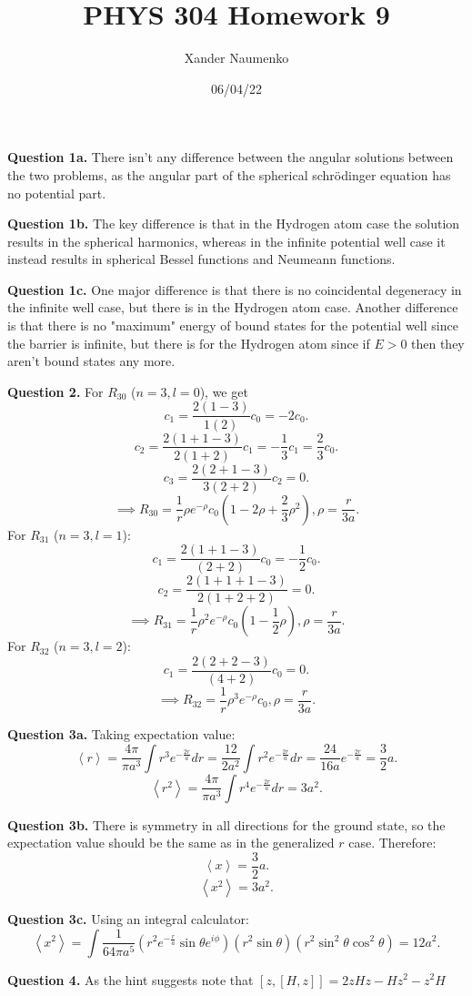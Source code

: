 \documentclass[letterpaper, reqno,11pt]{article}
\begin{document}
\title{PHYS 304 Homework 9}
\date{06/04/22}
\author{Xander Naumenko}
\maketitle

{\noindent\bf Question 1a.} There isn't any difference between the angular solutions between the two problems, as the angular part of the spherical schr\"odinger equation has no potential part. 

{\noindent\bf Question 1b.} The key difference is that in the Hydrogen atom case the solution results in the spherical harmonics, whereas in the infinite potential well case it instead results in spherical Bessel functions and Neumeann functions. 

{\noindent\bf Question 1c.} One major difference is that there is no coincidental degeneracy in the infinite well case, but there is in the Hydrogen atom case. Another difference is that there is no "maximum" energy of bound states for the potential well since the barrier is infinite, but there is for the Hydrogen atom since if $E>0$ then they aren't bound states any more. 

{\noindent\bf Question 2.} For $R_{30}$ ($n=3,l=0$), we get 
\[
c_1=\frac{2\left( 1-3 \right) }{1\left( 2 \right) }c_0=-2c_0
.\]
\[
c_2=\frac{2\left( 1+1-3 \right) }{2\left( 1+2 \right) }c_1=-\frac{1}{3}c_1=\frac{2}{3}c_0
.\]
\[
c_3=\frac{2(2+1-3)}{3\left( 2+2 \right) }c_2=0
.\]
\[
\implies R_{30}=\frac{1}{r}\rho e^{-\rho}c_0\left( 1-2\rho+\frac{2}{3}\rho^2 \right), \rho=\frac{r}{3a}
.\]
For $R_{31}$ ($n=3, l=1$):
\[
c_1=\frac{2\left( 1+1-3 \right) }{\left( 2+2 \right) }c_0=-\frac{1}{2}c_0
.\]
\[
c_2=\frac{2\left( 1+1+1-3 \right) }{2\left( 1+2+2 \right) }=0
.\]
\[
\implies R_{31}=\frac{1}{r}\rho^{2} e^{-\rho}c_0\left( 1-\frac{1}{2}\rho\right), \rho=\frac{r}{3a}
.\]
For $R_{32}$ ($n=3, l=2$):
\[
c_1=\frac{2\left( 2+2-3 \right) }{\left( 4+2 \right) }c_0=0
.\]
\[
\implies R_{32}=\frac{1}{r}\rho^{3} e^{-\rho}c_0, \rho=\frac{r}{3a}
.\]

{\noindent\bf Question 3a.} Taking expectation value: 
\[
\left<r \right>=\frac{4\pi}{\pi a^3 }\int r^{3} e^{-\frac{2r}{a}}dr=\frac{12}{2 a^2}\int r^2e^{-\frac{2r}{a}}dr=\frac{24}{16 a}e^{-\frac{2r}{a}}=\frac{3}{2}a
.\]
\[
\left<r^2 \right>=\frac{4\pi}{\pi a^3}\int r^{4}e^{-\frac{2r}{a}}dr=3a^2
.\]

{\noindent\bf Question 3b.} There is symmetry in all directions for the ground state, so the expectation value should be the same as in the generalized $r$ case. Therefore: 
\[
\left<x \right>=\frac{3}{2}a
.\]
\[
\left<x^2 \right>=3a^2
.\]

{\noindent\bf Question 3c.} Using an integral calculator: 
\[
\left<x^2 \right>=\int \frac{1}{64\pi a^{5}}\left( r^2e^{-\frac{r}{a}}\sin\theta e^{i\phi} \right)\left( r^2\sin\theta \right)  \left( r^2\sin^2\theta\cos^2\theta \right) =12a^2
.\]

{\noindent\bf Question 4.} As the hint suggests note that $[z, [H,z]]=2zHz-Hz^2-z^2H$
\end{document}
